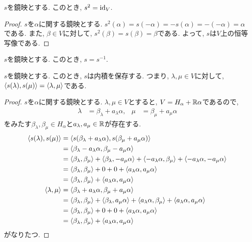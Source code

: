 \begin{prop}
  $s$を鏡映とする.
  このとき, $s^2=\operatorname{id}_V$.
\end{prop}
\begin{proof}
  $s$を$\alpha$に関する鏡映とする.
  $s^2(\alpha)=s(-\alpha)=-s(\alpha)=-(-\alpha)=\alpha$
  である.
  また, $\beta\in V$に対して,
  $s^2(\beta)=s(\beta)=\beta$である.
  よって,
  $s$は$V$上の恒等写像である.
\end{proof}

\begin{cor}
  $s$を鏡映とする.
  このとき, $s=s^{-1}$.
\end{cor}


\begin{prop}
  $s$を鏡映とする.
  このとき, $s$は内積を保存する.
  つまり, $\lambda,\mu\in V$に対して, $\Braket{s(\lambda),s(\mu)}=\Braket{\lambda,\mu}$である.
\end{prop}
\begin{proof}
  $s$を$\alpha$に関する鏡映とする.
  $\lambda,\mu\in V$とすると,
  $V=H_\alpha+\mathbb{R}\alpha$であるので,
  \begin{align*}
    \lambda &= \beta_\lambda + a_\lambda \alpha, 
    &\mu &= \beta_\mu + a_\mu \alpha 
  \end{align*}
  をみたす$\beta_\lambda, \beta_\mu \in H_\alpha$と$a_\lambda,a_\mu \in \mathbb{R}$が存在する.
  \begin{align*}
    \Braket{s(\lambda),s(\mu)}&=
    \Braket{s(\beta_\lambda + a_\lambda \alpha), s(\beta_\mu + a_\mu \alpha) }\\
    &=
    \Braket{\beta_\lambda - a_\lambda \alpha, \beta_\mu - a_\mu \alpha }\\
    &=
    \Braket{\beta_\lambda , \beta_\mu  }
    +\Braket{\beta_\lambda ,  - a_\mu \alpha }
    +\Braket{ - a_\lambda \alpha, \beta_\mu }
    +\Braket{ - a_\lambda \alpha, - a_\mu \alpha }\\
    &=
    \Braket{\beta_\lambda , \beta_\mu  }
    +0
    +0
    +\Braket{ a_\lambda \alpha, a_\mu \alpha }\\
    &=
    \Braket{\beta_\lambda , \beta_\mu  }
    +\Braket{ a_\lambda \alpha, a_\mu \alpha }\\
    \Braket{\lambda,\mu}&=
    \Braket{\beta_\lambda + a_\lambda \alpha, \beta_\mu + a_\mu \alpha }\\
    &=
    \Braket{\beta_\lambda , \beta_\mu  }
    +\Braket{\beta_\lambda ,  a_\mu \alpha }
    +\Braket{a_\lambda \alpha, \beta_\mu }
    +\Braket{a_\lambda \alpha, a_\mu \alpha }\\
    &=
    \Braket{\beta_\lambda , \beta_\mu  }
    +0
    +0
    +\Braket{ a_\lambda \alpha, a_\mu \alpha }\\
    &=
    \Braket{\beta_\lambda , \beta_\mu  }
    +\Braket{ a_\lambda \alpha, a_\mu \alpha }
  \end{align*}
  がなりたつ. 
\end{proof}

